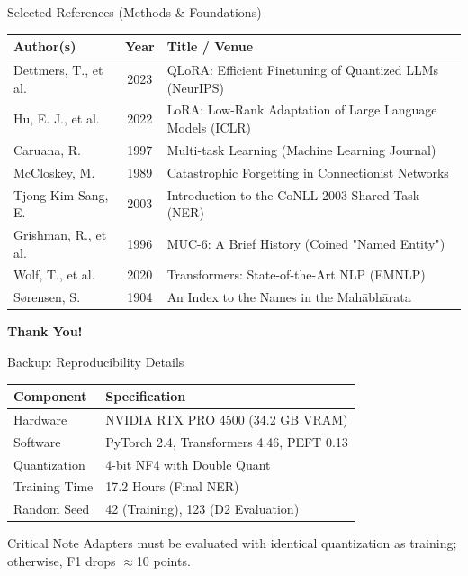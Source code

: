 \documentclass[10pt]{beamer}
\def\tpage{}
\newcommand{\tp}[1]{\def\tpage{#1}}
\begin{document}
\begin{frame}{Selected References (Methods \& Foundations)}
    \tp{56}
    \centering
    \scriptsize
    \begin{tabular}{p{3cm}cp{7.5cm}}
        \toprule
        \textbf{Author(s)} & \textbf{Year} & \textbf{Title / Venue} \\
        \midrule
        Dettmers, T., et al. & 2023 & QLoRA: Efficient Finetuning of Quantized LLMs (NeurIPS) \\
        Hu, E. J., et al. & 2022 & LoRA: Low-Rank Adaptation of Large Language Models (ICLR) \\
        Caruana, R. & 1997 & Multi-task Learning (Machine Learning Journal) \\
        McCloskey, M. & 1989 & Catastrophic Forgetting in Connectionist Networks \\
        Tjong Kim Sang, E. & 2003 & Introduction to the CoNLL-2003 Shared Task (NER) \\
        Grishman, R., et al. & 1996 & MUC-6: A Brief History (Coined "Named Entity") \\
        Wolf, T., et al. & 2020 & Transformers: State-of-the-Art NLP (EMNLP) \\
        Sørensen, S. & 1904 & An Index to the Names in the Mahābhārata \\
        \bottomrule
    \end{tabular}
\end{frame}

\begin{frame}[plain]
    \begin{center}
        \Huge \textbf{\color{DIATNavy}Thank You!}
    \end{center}
\end{frame}

\begin{frame}{Backup: Reproducibility Details}
    \begin{table}
        \centering
        \small
        \begin{tabular}{ll}
            \toprule
            \textbf{Component} & \textbf{Specification} \\
            \midrule
            Hardware & NVIDIA RTX PRO 4500 (34.2 GB VRAM) \\
            Software & PyTorch 2.4, Transformers 4.46, PEFT 0.13 \\
            Quantization & 4-bit NF4 with Double Quant \\
            Training Time & 17.2 Hours (Final NER) \\
            Random Seed & 42 (Training), 123 (D2 Evaluation) \\
            \bottomrule
        \end{tabular}
    \end{table}
    \vfill
    \begin{alertblock}{Critical Note}
        Adapters must be evaluated with identical quantization as training; otherwise, F1 drops $\approx$10 points.
    \end{alertblock}
\end{frame}
\end{document}
